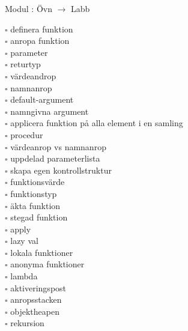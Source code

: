 
    Modul : Övn  $\rightarrow$ Labb 
    \begin{multicols}{3}\SlideFontTiny
    $\square$ definera funktion \\
$\square$ anropa funktion \\
$\square$ parameter \\
$\square$ returtyp \\
$\square$ värdeandrop \\
$\square$ namnanrop \\
$\square$ default-argument \\
$\square$ namngivna argument \\
$\square$ applicera funktion på alla element i en samling \\
$\square$ procedur \\
$\square$ värdeanrop vs namnanrop \\
$\square$ uppdelad parameterlista \\
$\square$ skapa egen kontrollstruktur \\
$\square$ funktionsvärde \\
$\square$ funktionstyp \\
$\square$ äkta funktion \\
$\square$ stegad funktion \\
$\square$ apply \\
$\square$ lazy val \\
$\square$ lokala funktioner \\
$\square$ anonyma funktioner \\
$\square$ lambda \\
$\square$ aktiveringspost \\
$\square$ anropsstacken \\
$\square$ objektheapen \\
$\square$ rekursion \\
    \end{multicols}
    